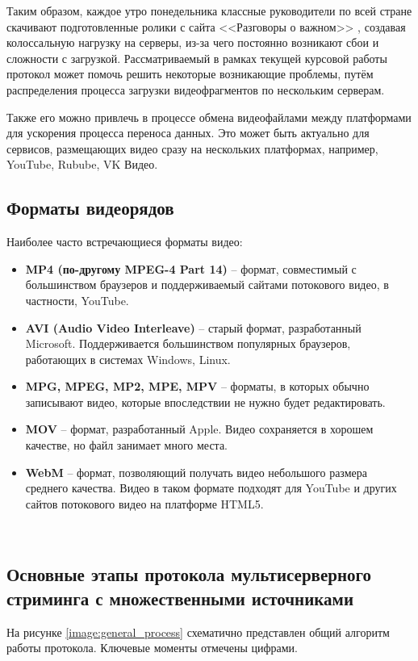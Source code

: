Таким образом, каждое утро понедельника классные руководители по всей стране скачивают подготовленные ролики с сайта <<Разговоры о важном>> \cite{speeches}, создавая колоссальную нагрузку на серверы, из-за чего постоянно возникают сбои и сложности с загрузкой. Рассматриваемый в рамках текущей курсовой работы протокол может помочь решить некоторые возникающие проблемы, путём распределения процесса загрузки видеофрагментов по нескольким серверам.

Также его можно привлечь в процессе обмена видеофайлами между платформами для ускорения процесса переноса данных. Это может быть актуально для сервисов, размещающих видео сразу на нескольких платформах, например, YouTube, Rubube, VK Видео. \\

\subsection{Форматы видеорядов}
Наиболее часто встречающиеся форматы видео:
\begin{itemize}
	\item \textbf{MP4 (по-другому MPEG-4 Part 14)} – формат, совместимый с большинством браузеров и поддерживаемый сайтами потокового видео, в частности, YouTube.
	
	\item \textbf{AVI (Audio Video Interleave)} – старый формат, разработанный Microsoft. Поддерживается большинством популярных браузеров, работающих в системах Windows, Linux. 
	
	\item \textbf{MPG, MPEG, MP2, MPE, MPV} – форматы, в которых обычно записывают видео, которые впоследствии не нужно будет редактировать.
	
	\item \textbf{MOV} – формат, разработанный Apple. Видео сохраняется в хорошем качестве, но файл занимает много места.
	
	\item \textbf{WebM} – формат, позволяющий получать видео небольшого размера среднего качества. Видео в таком формате подходят для YouTube и других сайтов потокового видео на платформе HTML5.
\end{itemize}

\\

\subsection{Основные этапы протокола мультисерверного стриминга с множественными источниками}
На рисунке \ref{image:general_process} схематично представлен общий алгоритм работы протокола. Ключевые моменты отмечены цифрами.


